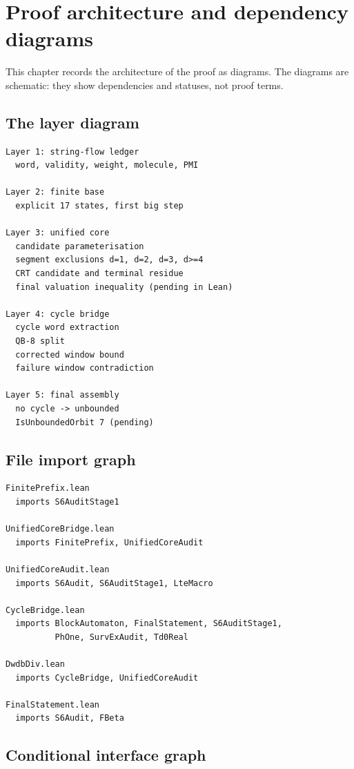 \section{Proof architecture and dependency diagrams}

This chapter records the architecture of the proof as diagrams.  The
diagrams are schematic: they show dependencies and statuses, not
proof terms.

\subsection{The layer diagram}

\begin{verbatim}
Layer 1: string-flow ledger
  word, validity, weight, molecule, PMI

Layer 2: finite base
  explicit 17 states, first big step

Layer 3: unified core
  candidate parameterisation
  segment exclusions d=1, d=2, d=3, d>=4
  CRT candidate and terminal residue
  final valuation inequality (pending in Lean)

Layer 4: cycle bridge
  cycle word extraction
  QB-8 split
  corrected window bound
  failure window contradiction

Layer 5: final assembly
  no cycle -> unbounded
  IsUnboundedOrbit 7 (pending)
\end{verbatim}

\subsection{File import graph}

\begin{verbatim}
FinitePrefix.lean
  imports S6AuditStage1

UnifiedCoreBridge.lean
  imports FinitePrefix, UnifiedCoreAudit

UnifiedCoreAudit.lean
  imports S6Audit, S6AuditStage1, LteMacro

CycleBridge.lean
  imports BlockAutomaton, FinalStatement, S6AuditStage1,
          PhOne, SurvExAudit, Td0Real

DwdbDiv.lean
  imports CycleBridge, UnifiedCoreAudit

FinalStatement.lean
  imports S6Audit, FBeta
\end{verbatim}

\subsection{Conditional interface graph}


